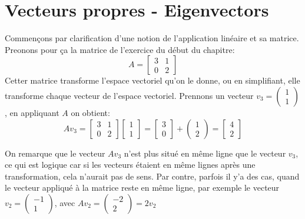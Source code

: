 \section{Vecteurs propres - Eigenvectors}
Commençons par clarification d'une notion de l'application linéaire et sa matrice. Preonons pour ça la matrice de l'exercice du début du chapitre:
\[
A = \begin{bmatrix} 
       3 & 1\\
       0 & 2
   \end{bmatrix}
\] 
Cetter matrice transforme l'espace vectoriel qu'on le donne, ou en simplifiant, elle transforme chaque vecteur de l'espace vectoriel. Prennons un vecteur $v_3 = \begin{pmatrix} 1 \\ 1 \end{pmatrix} $, en appliquant $A$ on obtient:
 \[
Av_3 = \begin{bmatrix} 
       3 & 1\\
       0 & 2
   \end{bmatrix}\begin{bmatrix} 1 \\ 1 \end{bmatrix} = \begin{bmatrix} 3 \\ 0 \end{bmatrix} + \begin{pmatrix} 1 \\ 2 \end{pmatrix} = \begin{bmatrix} 4 \\ 2 \end{bmatrix} 
\] 

\begin{center}
    
\end{center}
On remarque que le vecteur $Av_3$ n'est plus situé en même ligne que le vecteur $v_3$, ce qui est logique car si les vecteurs étaient en même lignes après une transformation, cela n'aurait pas de sens.
Par contre, parfois il y'a des cas, quand le vecteur appliqué à la matrice reste en même ligne, par exemple le vecteur $v_2 = \begin{pmatrix} -1 \\ 1 \end{pmatrix} $, avec $Av_2 = \begin{pmatrix} -2 \\ 2 \end{pmatrix} = 2v_2 $

